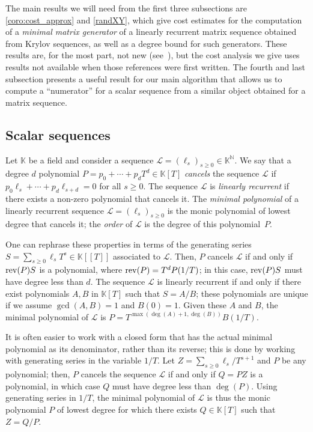 \documentclass[12pt]{article}
\newcommand{\genseries}{Z}
\newcommand{\minpoly}{P}
\def\N {\ensuremath{\mathbb{N}}}
\def\K{\mathbb{K}}
\def\K {\ensuremath{\mathbb{K}}}
\begin{document}
The main results we will need from the first three subsections are
\cref{coro:cost_approx} and \cref{randXY}, which give cost estimates for the
computation of a {\em minimal matrix generator} of a linearly recurrent matrix
sequence obtained from Krylov sequences, as well as a degree bound for such
generators. These results are, for the most part, not new
(see~\cite{Villard97,Villard97a,KalVil01,Turner02}), but the cost analysis we
give uses results not available when those references were first written.  The
fourth and last subsection presents a useful result for our main algorithm
that allows us to compute a ``numerator'' for a scalar sequence from a similar
object obtained for a matrix sequence.


\subsection{Scalar sequences} \label{section:linseq}

Let $\K$ be a field and consider a sequence $\mathcal{L}=(\ell_s)_{s
  \ge 0} \in \K^\N$. We say that a degree $d$ polynomial $\minpoly =
p_0 + \cdots + p_d T^d \in\K[T]$ {\em cancels} the sequence
$\mathcal{L}$ if $p_0 \ell_s + \cdots + p_d \ell_{s+d}=0$ for all $s
\ge 0$. The sequence $\mathcal{L}$ is {\em linearly recurrent} if
there exists a non-zero polynomial that cancels it.  The {\em minimal
  polynomial} of a linearly recurrent sequence
$\mathcal{L}=(\ell_s)_{s \ge 0}$ is the monic polynomial of lowest
degree that cancels it; the {\em order} of $\mathcal{L}$ is the degree
of this polynomial~$\minpoly$.

One can rephrase these properties in terms of the generating series $S=\sum_{s
\ge 0} \ell_s T^s \in \K[[T]]$ associated to $\mathcal{L}$.  Then, $\minpoly$
cancels $\mathcal{L}$ if and only if ${\rm rev}(\minpoly) S$ is a polynomial,
where ${\rm rev}(\minpoly)=T^d \minpoly(1/T)$; in this case, ${\rm
rev}(\minpoly) S$ must have degree less than $d$.  The sequence $\mathcal{L}$
is linearly recurrent if and only if there exist polynomials $A,B$ in $\K[T]$
such that $S=A/B$; these polynomials are unique if we assume $\gcd(A,B)=1$ and
$B(0)=1$.  Given these $A$ and $B$, the minimal polynomial of $\mathcal{L}$ is
$\minpoly = T^{\max(\deg(A)+1,\deg(B))}B(1/T)$. 

It is often easier to work with a closed form that has the actual
minimal polynomial as its denominator, rather than its reverse; this
is done by working with generating series in the variable $1/T$.  Let
$\genseries = \sum_{s\ge0} \ell_s / T^{s+1}$ and $\minpoly$
be any polynomial; then, $\minpoly$ cancels the sequence $\mathcal{L}$
if and only if $Q=\minpoly \genseries $ is a polynomial, in which case $Q$
must have degree less than $\deg(\minpoly)$.  Using generating series in
$1/T$, the minimal polynomial of $\mathcal{L}$ is thus the
monic polynomial $\minpoly$ of lowest degree for which there exists $Q \in
\K[T]$ such that $\genseries=Q/\minpoly$.
\end{document}
